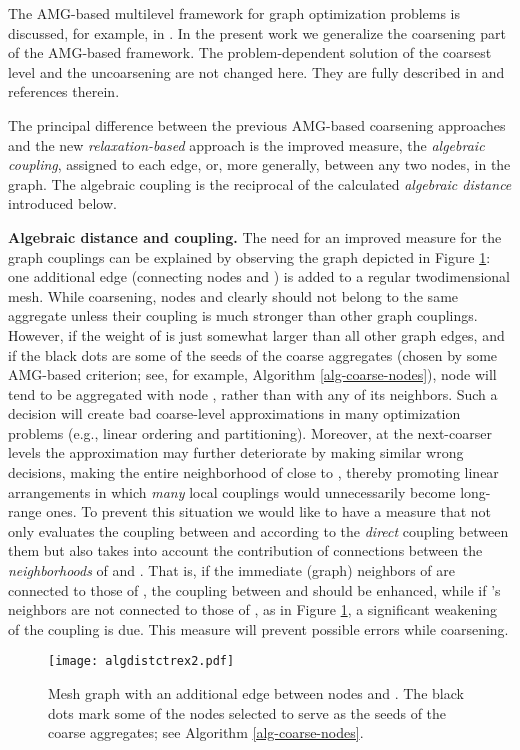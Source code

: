 \documentclass[final]{siamltex}
\begin{document}
\par The AMG-based multilevel framework for graph optimization problems is discussed, for example, in \cite{safro2005}.
In the present work we generalize the coarsening part of the AMG-based
framework. The problem-dependent solution of the coarsest level
and the uncoarsening are not changed here. They are
fully described in \cite{safro2005} and references therein.
\par The principal difference between the previous AMG-based coarsening approaches
\cite{safro2005,Hu01amultilevel,cheval-mlpartcompar}
and the new {\it relaxation-based} approach is the improved
measure, the {\it algebraic coupling},
assigned to each edge, or, more generally, between any two nodes, in the graph. The algebraic
coupling is the reciprocal of the calculated {\it algebraic distance}
introduced below.
\par {\bf Algebraic distance and coupling.} The need for an improved
measure for the graph couplings can be explained by observing the
graph depicted in Figure \ref{fig:meshexample}: one additional edge
 (connecting nodes  and ) is added to a regular twodimensional mesh. While coarsening, nodes 
and  clearly should not belong to the same aggregate unless their coupling
is much stronger than other graph couplings. However, if the
weight of  is just somewhat larger than all other graph edges, and if the
black dots are some of the seeds of the coarse aggregates (chosen
by some AMG-based criterion; see, for example, Algorithm \ref{alg-coarse-nodes}), node  will
tend to be aggregated with node , rather than with any of its neighbors.
Such a decision will create bad coarse-level approximations
in many optimization problems (e.g., linear ordering and
partitioning). Moreover, at the next-coarser levels the approximation
may further deteriorate by making similar wrong decisions, making the entire neighborhood of  close to , thereby promoting linear arrangements in which {\it many} local couplings would unnecessarily become long-range ones. To
prevent this situation we would like to have a measure that not only
evaluates the coupling between  and  according to
the {\it direct} coupling between them but also takes into
account the contribution of connections between the {\it
neighborhoods} of  and . That is, if the immediate (graph)
neighbors of  are connected to those of ,
the coupling between  and  should be enhanced, while if
's neighbors are not connected to those of , as in Figure
\ref{fig:meshexample}, a significant weakening of the
 coupling is due. This
measure will prevent possible errors while coarsening.
\begin{figure}[h]
\centering
\texttt{[image: algdistctrex2.pdf]}
\caption{Mesh graph with an additional edge between nodes 
and . The black dots mark some of the nodes selected to serve
as the seeds of the coarse aggregates; see Algorithm \ref{alg-coarse-nodes}.}\label{fig:meshexample}
\end{figure}
\end{document}
